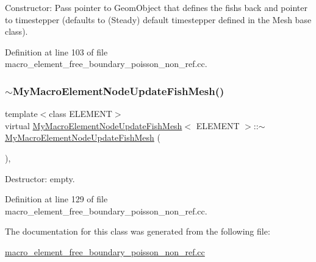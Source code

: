 Constructor\+: Pass pointer to Geom\+Object that defines the fish\textquotesingle{}s back and pointer to timestepper (defaults to (Steady) default timestepper defined in the Mesh base class). 



Definition at line 103 of file macro\+\_\+element\+\_\+free\+\_\+boundary\+\_\+poisson\+\_\+non\+\_\+ref.\+cc.

\mbox{\label{classMyMacroElementNodeUpdateFishMesh_a4498627c037a3f16330ec0c2ff820d1c}} 
\subsubsection{\texorpdfstring{$\sim$\+My\+Macro\+Element\+Node\+Update\+Fish\+Mesh()}{~MyMacroElementNodeUpdateFishMesh()}}
{\footnotesize\ttfamily template$<$class E\+L\+E\+M\+E\+NT$>$ \\
virtual \hyperlink{classMyMacroElementNodeUpdateFishMesh}{My\+Macro\+Element\+Node\+Update\+Fish\+Mesh}$<$ E\+L\+E\+M\+E\+NT $>$\+::$\sim$\hyperlink{classMyMacroElementNodeUpdateFishMesh}{My\+Macro\+Element\+Node\+Update\+Fish\+Mesh} (\begin{DoxyParamCaption}{ }\end{DoxyParamCaption})\hspace{0.3cm}{\ttfamily [inline]}, {\ttfamily [virtual]}}



Destructor\+: empty. 



Definition at line 129 of file macro\+\_\+element\+\_\+free\+\_\+boundary\+\_\+poisson\+\_\+non\+\_\+ref.\+cc.



The documentation for this class was generated from the following file\+:\begin{DoxyCompactItemize}
\item 
\hyperlink{macro__element__free__boundary__poisson__non__ref_8cc}{macro\+\_\+element\+\_\+free\+\_\+boundary\+\_\+poisson\+\_\+non\+\_\+ref.\+cc}\end{DoxyCompactItemize}
